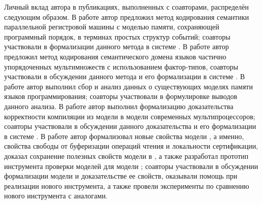 
Личный вклад автора в публикациях, выполненных с соавторами, распределён следующим образом.
В работе \cite{Gladstein-al:ISPRAS21} автор предложил
метод кодирования семантики параллельной регистровой машины с
моделью памяти, сохраняющей программный порядок, в терминах простых структур событий;
соавторы участвовали в формализации данного метода в системе \coq.
В работе \cite{Moiseenko-al:STJITMO22} автор предложил
метод кодирования семантического домена языков частично упорядоченных мультимножеств
с использованием фактор-типов, 
соавторы участвовали в обсуждении данного метода и его формализации в системе \coq.
В работе \cite{Moiseenko-al:PCS21} автор выполнил сбор и анализ данных
о существующих моделях памяти языков программирования;
соавторы участвовали в формулировке выводов данного анализа.
В работе \cite{Moiseenko-al:ECOOP20} автор выполнил
формализацию доказательства корректности компиляции из
модели \Wkm в модели современных мультипроцессоров;
соавторы участвовали в обсуждении данного доказательства
и его формализации в системе \coq.
В работе \cite{Moiseenko-al:OOPSLA22} автор
формализовал новые свойства модели \WkmS,
а именно, свойства свободы от буферизации операций чтения и локальности сертификации,
доказал сохранение полезных свойств модели \Wkm в \WkmS,
а также разработал прототип инструмента проверки моделей \wmc 
для модели \WkmS; соавторы участвовали в обсуждении формализации модели \WkmS
и доказательстве ее свойств, оказывали помощь при реализации нового инструмента,
а также провели эксперименты по сравнению нового инструмента с аналогами.
